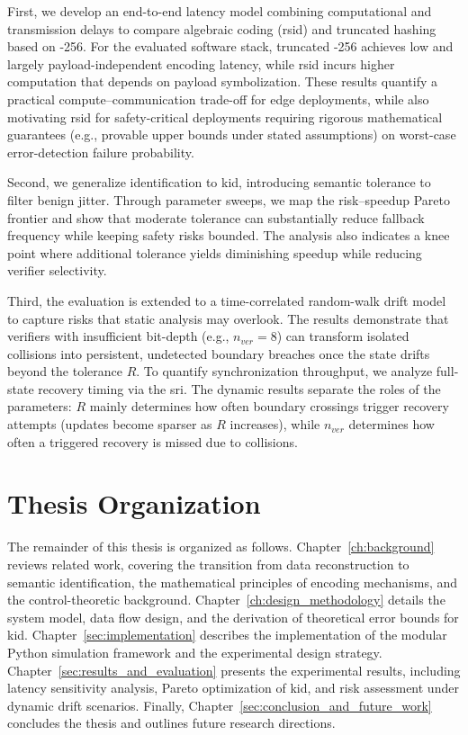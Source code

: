 First, we develop an end-to-end latency model combining computational and transmission delays to compare algebraic coding (\gls{rsid}) and truncated hashing based on -256. For the evaluated software stack, truncated -256 achieves low and largely payload-independent encoding latency, while \gls{rsid} incurs higher computation that depends on payload symbolization. These results quantify a practical compute--communication trade-off for edge deployments, while also motivating \gls{rsid} for safety-critical deployments requiring rigorous mathematical guarantees (e.g., provable upper bounds under stated assumptions) on worst-case error-detection failure probability.

Second, we generalize identification to \gls{kid}, introducing semantic tolerance to filter benign jitter. Through parameter sweeps, we map the risk--speedup Pareto frontier and show that moderate tolerance can substantially reduce fallback frequency while keeping safety risks bounded. The analysis also indicates a knee point where additional tolerance yields diminishing speedup while reducing verifier selectivity.

Third, the evaluation is extended to a time-correlated random-walk drift model to capture risks that static analysis may overlook. The results demonstrate that verifiers with insufficient bit-depth (e.g., $n_{ver}=8$) can transform isolated collisions into persistent, undetected boundary breaches once the state drifts beyond the tolerance $R$. To quantify synchronization throughput, we analyze full-state recovery timing via the \gls{sri}. The dynamic results separate the roles of the parameters: $R$ mainly determines how often boundary crossings trigger recovery attempts (updates become sparser as $R$ increases), while $n_{ver}$ determines how often a triggered recovery is missed due to collisions.

\section{Thesis Organization}
\label{sec:organization}

The remainder of this thesis is organized as follows. Chapter~\ref{ch:background} reviews related work, covering the transition from data reconstruction to semantic identification, the mathematical principles of encoding mechanisms, and the control-theoretic background. Chapter~\ref{ch:design_methodology} details the system model, data flow design, and the derivation of theoretical error bounds for \gls{kid}. Chapter~\ref{sec:implementation} describes the implementation of the modular Python simulation framework and the experimental design strategy. Chapter~\ref{sec:results_and_evaluation} presents the experimental results, including latency sensitivity analysis, Pareto optimization of \gls{kid}, and risk assessment under dynamic drift scenarios. Finally, Chapter~\ref{sec:conclusion_and_future_work} concludes the thesis and outlines future research directions.